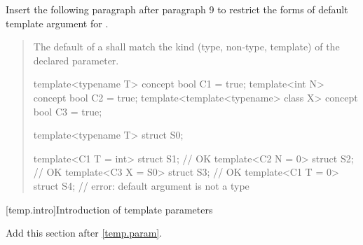 Insert the following paragraph after paragraph 9 to restrict the forms 
of default template argument for .

\begin{quote}
\setcounter{Paras}{11}
\pnum
The default  of
a  shall match
the kind (type, non-type, template) of the declared parameter.

\enterexample
\begin{codeblock}
template<typename T> concept bool C1 = true;
template<int N> concept bool C2 = true;
template<template<typename> class X> concept bool C3 = true;

template<typename T> struct S0;

template<C1 T = int> struct S1; // OK
template<C2 N = 0> struct S2;   // OK
template<C3 X = S0> struct S3;  // OK
template<C1 T = 0> struct S4;   // error: default argument is not a type
\end{codeblock}
\exitexample
\end{quote}


[temp.intro]{Introduction of template parameters}

Add this section after \ref{temp.param}.

